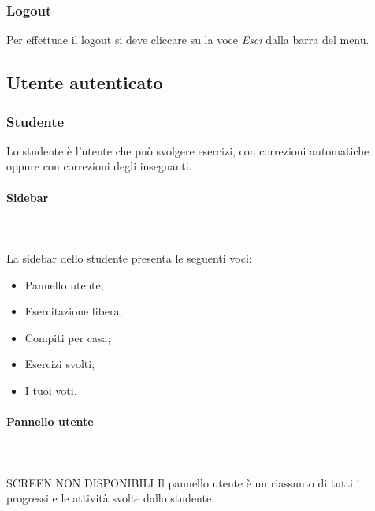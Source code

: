     \subsubsection{Logout}
    Per effettuae il {logout} si deve cliccare su la voce \textit{Esci} dalla barra del menu.
    \newpage

\subsection{Utente autenticato}

    \subsubsection{Studente}
    Lo studente è l'utente che può svolgere esercizi, con correzioni
    automatiche oppure con correzioni degli insegnanti.
        \paragraph{Sidebar} \mbox{}\\ \\
            La sidebar dello studente presenta le seguenti voci:
            \begin{itemize}
                \item Pannello utente;
                \item Esercitazione libera;
                \item Compiti per casa;
                \item Esercizi svolti;
                \item I tuoi voti.
            \end{itemize}
        \paragraph{Pannello utente}\mbox{}\\ \\
        SCREEN NON DISPONIBILI
        Il pannello utente è un riassunto di tutti i progressi e le attività
        svolte dallo studente.
